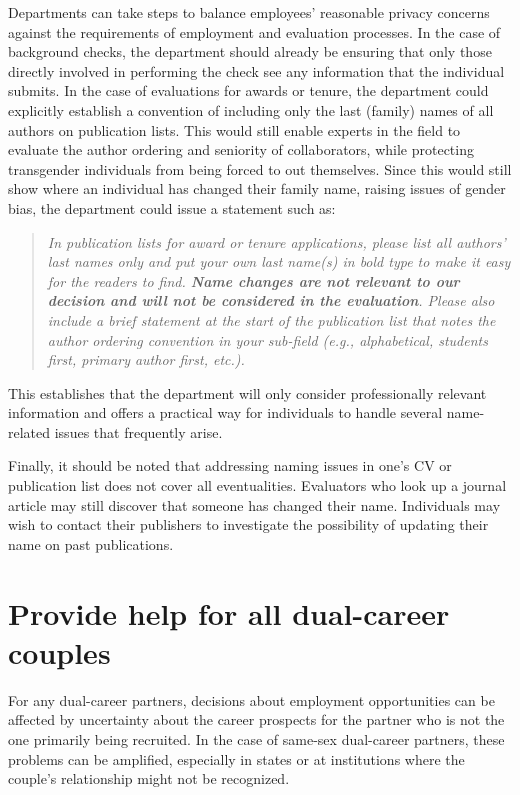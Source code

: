 Departments can take steps to balance employees' reasonable privacy concerns against the requirements of employment and evaluation processes. In the case of background checks, the department should already be ensuring that only those directly involved in performing the check see any information that the individual submits. In the case of evaluations for awards or tenure, the department could explicitly establish a convention of including only the last (family) names of all authors on publication lists. This would still enable experts in the field to evaluate the author ordering and seniority of collaborators, while protecting transgender individuals from being forced to out themselves. Since this would still show where an individual has changed their family name, raising issues of gender bias, the department could issue a statement such as:
\begin{quote}
	\emph{In publication lists for award or tenure applications, please list all authors' last names only and put your own last name(s) in bold type to make it easy for the readers to find. \textbf{Name changes are not relevant to our decision and will not be considered in the evaluation}. Please also include a brief statement at the start of the publication list that notes the author ordering convention in your sub-field (e.g., alphabetical, students first, primary author first, etc.).}
\end{quote}
This establishes that the department will only consider professionally relevant information and offers a practical way for individuals to handle several name-related issues that frequently arise.

Finally, it should be noted that addressing naming issues in one's CV or publication list does not cover all eventualities. Evaluators who look up a journal article may still discover that someone has changed their name. Individuals may wish to contact their publishers to investigate the possibility of updating their name on past publications.



\section {Provide help for all dual-career couples}
\label{dual-career}
For any dual-career partners, decisions about employment opportunities can be affected by uncertainty about the career prospects for the partner who is not the one primarily being recruited. In the case of same-sex dual-career partners, these problems can be amplified, especially in states or at institutions where the couple's relationship might not be recognized.  

